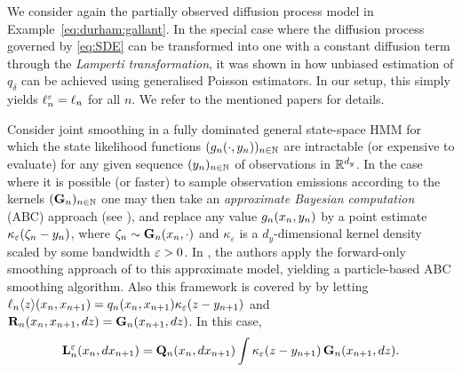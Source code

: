 \begin{example} \label{ex:exact:algorithm}
We consider again the partially observed diffusion process model in Example~\ref{eq:durham:gallant}. In the special case where the diffusion process governed by \eqref{eq:SDE} can be transformed into one with a constant diffusion term through the \emph{Lamperti transformation}, it was shown in \cite{beskos:papaspiliopoulos:roberts:fearnhead:2006,fearnhead2008particle} how unbiased estimation of $q_\delta$ can be achieved using generalised Poisson estimators. In our setup, this simply yields $\ell^\varepsilon_{n} = \ell_{n}$ for all $n$. We refer to the mentioned papers for details. 
\end{example}

\begin{example} 
Consider joint smoothing in a fully dominated general state-space HMM for which the state likelihood functions $(g_{n}(\cdot, y_n))_{n \in \mathbb{N}}$ are intractable (or expensive to evaluate) for any given sequence $(y_n)_{n \in \mathbb{N}}$ of observations in $\mathbb{R}^{d_y}$. In the case where it is possible (or faster) to sample observation emissions according to the kernels $(\mathbf{G}_n)_{n \in \mathbb{N}}$ one may then 
take an \emph{approximate Bayesian computation} (ABC) approach (see {\eg}  \cite{marin:pudlo:robert:ryder:2012}), and replace any value $g_{n}(x_n, y_n)$ by a point estimate $\kappa_\varepsilon(\zeta_n - y_n)$, where $\zeta_n \sim \mathbf{G}_n(x_n, \cdot)$ and $\kappa_\varepsilon$ is a $d_y$-dimensional kernel density scaled by some bandwidth $\varepsilon > 0$. In \cite{martin:jasra:singh:whiteley:delmoral:maccoy:2014}, the authors apply the forward-only smoothing approach of \cite{delmoral:doucet:singh:2010} to this approximate model, yielding a particle-based ABC smoothing algorithm. Also this framework is covered by  by letting $\ell_{n} \langle z \rangle(x_n, x_{n + 1}) = q_{n}(x_n, x_{n + 1}) \kappa_\varepsilon(z - y_{n + 1})$ and $\mathbf{R}_{n}(x_n, x_{n + 1}, d z) = \mathbf{G}_n(x_{n + 1}, d z)$. In this case, 
\begin{equation} \label{eq:ukmod:ABC:smoothing}
\ukmod{n}(x_n, \rmd x_{n + 1}) = \hk_n(x_n, \rmd x_{n + 1}) \int \kappa_\precpar(z - y_{n + 1}) \, \mk_n(x_{n + 1}, \rmd z). 
\end{equation}
\end{example}


